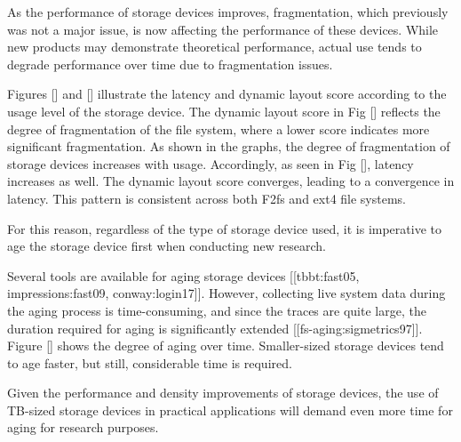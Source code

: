 As the performance of storage devices improves, fragmentation, which previously was not a major issue, is now affecting the performance of these devices.
While new products may demonstrate theoretical performance, actual use tends to degrade performance over time due to fragmentation issues.

Figures [] and [] illustrate the latency and dynamic layout score according to the usage level of the storage device. 
The dynamic layout score in Fig [] reflects the degree of fragmentation of the file system, where a lower score indicates more significant fragmentation.
As shown in the graphs, the degree of fragmentation of storage devices increases with usage. Accordingly, as seen in Fig [], latency increases as well.
The dynamic layout score converges, leading to a convergence in latency. This pattern is consistent across both F2fs and ext4 file systems.

For this reason, regardless of the type of storage device used, it is imperative to age the storage device first when conducting new research.

Several tools are available for aging storage devices [[tbbt:fast05, impressions:fast09, conway:login17]]. 
However, collecting live system data during the aging process is time-consuming, and since the traces are quite large, the duration required for aging is significantly extended [[fs-aging:sigmetrics97]]. 
Figure [] shows the degree of aging over time. Smaller-sized storage devices tend to age faster, but still, considerable time is required.

Given the performance and density improvements of storage devices, the use of TB-sized storage devices in practical applications will demand even more time for aging for research purposes.



